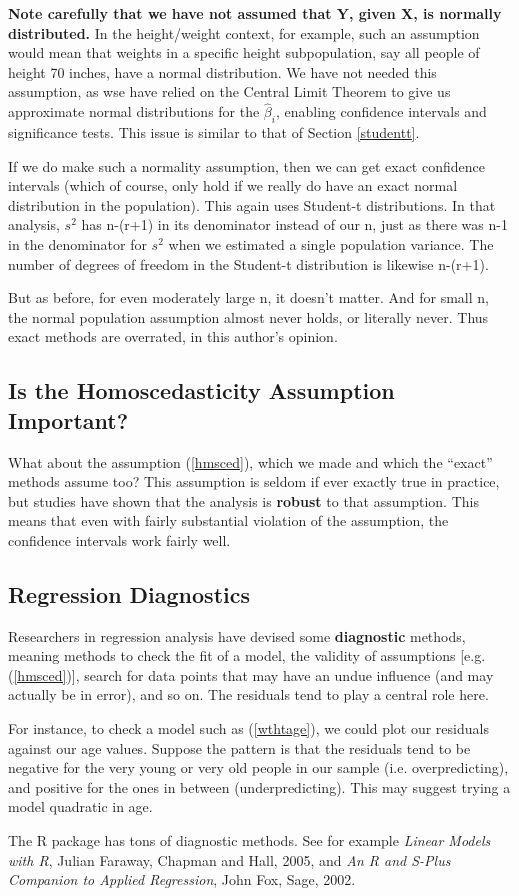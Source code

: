 {\bf Note carefully that we have not assumed that Y, given X, is
normally distributed.}  In the height/weight context, for example, such
an assumption would mean that weights in a specific height
subpopulation, say all people of height 70 inches, have a normal
distribution.  We have not needed this assumption, as wse have relied on
the Central Limit Theorem to give us approximate normal distributions
for the $\widehat{\beta}_i$, enabling confidence intervals and
significance tests.  This issue is similar to that of Section
\ref{studentt}.  

If we do make such a normality assumption, then we can get exact
confidence intervals (which of course, only hold if we really do have an
exact normal distribution in the population).  This again uses Student-t
distributions.  In that analysis, $s^2$ has n-(r+1) in its denominator
instead of our n, just as there was n-1 in the denominator for $s^2$
when we estimated a single population variance.  The number of degrees
of freedom in the Student-t distribution is likewise n-(r+1).  

But as before, for even moderately large n, it doesn't matter.  And for
small n, the normal population assumption almost never holds, or
literally never.  Thus exact methods are overrated, in this author's
opinion.

\subsection{Is the Homoscedasticity Assumption Important?}

What about the assumption (\ref{hmsced}), which we made and which the
``exact'' methods assume too?  This assumption is seldom if ever exactly
true in practice, but studies have shown that the analysis is {\bf
robust} to that assumption.  This means that even with fairly substantial
violation of the assumption, the confidence intervals work fairly well.

\subsection{Regression Diagnostics}
\label{diags}

Researchers in regression analysis have devised some {\bf diagnostic} 
methods, meaning methods to check the fit of a model, the validity of
assumptions [e.g. (\ref{hmsced})], search for data points that may have
an undue influence (and may actually be in error), and so on.  The
residuals tend to play a central role here.

For instance, to check a model such as (\ref{wthtage}), we could plot
our residuals against our age values.  Suppose the pattern is that the
residuals tend to be negative for the very young or very old people in
our sample (i.e. overpredicting), and positive for the ones in between
(underpredicting).  This may suggest trying a model quadratic in age.

The R package has tons of diagnostic methods.  See for example 
{\it Linear Models with R}, Julian Faraway, Chapman and Hall, 2005, and
{\it An R and S-Plus Companion to Applied Regression}, John Fox, Sage,
2002.

